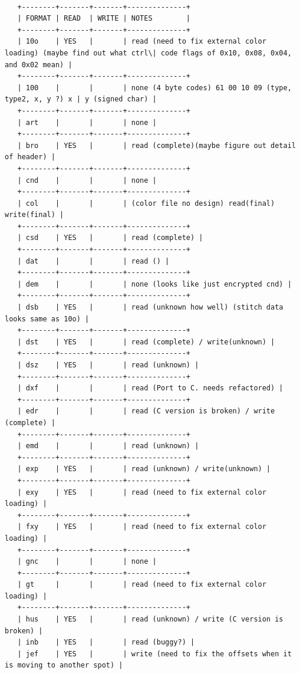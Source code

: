 \documentclass[11pt]{report}
\begin{document}
\begin{verbatim}
   
   +--------+-------+-------+--------------+
   | FORMAT | READ  | WRITE | NOTES        |
   +--------+-------+-------+--------------+
   | 10o    | YES   |       | read (need to fix external color loading) (maybe find out what ctrl\| code flags of 0x10, 0x08, 0x04, and 0x02 mean) |
   +--------+-------+-------+--------------+
   | 100    |       |       | none (4 byte codes) 61 00 10 09 (type, type2, x, y ?) x | y (signed char) |
   +--------+-------+-------+--------------+
   | art    |       |       | none |
   +--------+-------+-------+--------------+
   | bro    | YES   |       | read (complete)(maybe figure out detail of header) |
   +--------+-------+-------+--------------+
   | cnd    |       |       | none |
   +--------+-------+-------+--------------+
   | col    |       |       | (color file no design) read(final) write(final) |
   +--------+-------+-------+--------------+
   | csd    | YES   |       | read (complete) |
   +--------+-------+-------+--------------+
   | dat    |       |       | read () |
   +--------+-------+-------+--------------+
   | dem    |       |       | none (looks like just encrypted cnd) |
   +--------+-------+-------+--------------+
   | dsb    | YES   |       | read (unknown how well) (stitch data looks same as 10o) |
   +--------+-------+-------+--------------+
   | dst    | YES   |       | read (complete) / write(unknown) |
   +--------+-------+-------+--------------+
   | dsz    | YES   |       | read (unknown) |
   +--------+-------+-------+--------------+
   | dxf    |       |       | read (Port to C. needs refactored) |
   +--------+-------+-------+--------------+
   | edr    |       |       | read (C version is broken) / write (complete) |
   +--------+-------+-------+--------------+
   | emd    |       |       | read (unknown) |
   +--------+-------+-------+--------------+
   | exp    | YES   |       | read (unknown) / write(unknown) |
   +--------+-------+-------+--------------+
   | exy    | YES   |       | read (need to fix external color loading) |
   +--------+-------+-------+--------------+
   | fxy    | YES   |       | read (need to fix external color loading) |
   +--------+-------+-------+--------------+
   | gnc    |       |       | none |
   +--------+-------+-------+--------------+
   | gt     |       |       | read (need to fix external color loading) |
   +--------+-------+-------+--------------+
   | hus    | YES   |       | read (unknown) / write (C version is broken) |
   | inb    | YES   |       | read (buggy?) |
   | jef    | YES   |       | write (need to fix the offsets when it is moving to another spot) |

\end{verbatim}
\end{document}
